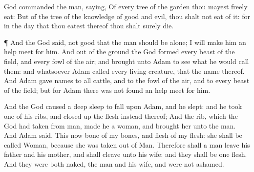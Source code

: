 {{}
God
commanded the
man,
saying, Of every
tree of the
garden thou mayest
freely
eat:
But of the
tree of the
knowledge of
good and
evil, thou shalt not
eat of it: for in the
day that thou
eatest thereof thou shalt
surely
die.
\par }{\PP {}¶ And the
{}
God
said,
{} not
good that the
man should
be alone; I will
make him an help
meet for him.
And out of the
ground the
{}
God
formed every
beast of the
field, and every
fowl of the
air; and
brought
{} unto
Adam to
see what he would
call them: and whatsoever
Adam
called every
living
creature,
that
{} the name
thereof.
And
Adam
gave
names to all
cattle, and to the
fowl of the
air, and to every
beast of the
field; but for
Adam there was not
found an help
meet for him.
\par }{\PP {}And the
{}
God
caused a deep
sleep to
fall upon
Adam, and he
slept: and he
took
one of his
ribs, and closed
up the
flesh instead thereof;
And the
rib, which the
{}
God had
taken from
man,
made he a
woman, and
brought her unto the
man.
And
Adam
said,
This
{}
now
bone of my
bones, and
flesh of my
flesh:
she shall be
called
Woman, because
she was
taken out of
Man.
Therefore shall a
man
leave his
father and his
mother, and shall
cleave unto his
wife: and they shall be
one
flesh.
And they were
both
naked, the
man and his
wife, and were not
ashamed.

}
